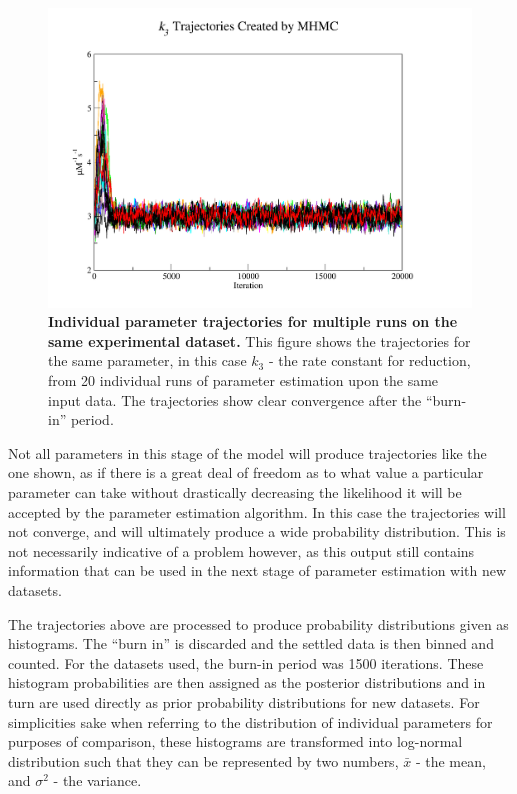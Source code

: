 \begin{figure}[p]
 \centering
 \includegraphics[width=14cm, trim=75px 50px 125px 25px]{./05-oxygenreduction/data/k3s1.pdf}
 \caption[Individual parameter trajectories for multiple runs on the same experimental dataset]{{\bf Individual parameter trajectories for multiple runs on the same experimental dataset.} This figure shows the trajectories for the same parameter, in this case $k_3$ - the rate constant for \cbbthree{} reduction, from 20 individual runs of parameter estimation upon the same input data. The trajectories show clear convergence after the ``burn-in'' period.
 \label{fig:k3s}}
\end{figure}
\afterpage{\clearpage}

Not all parameters in this stage of the model will produce trajectories like the one shown, as if there is a great deal of freedom as to what value a particular parameter can take without drastically decreasing the likelihood it will be accepted by the parameter estimation algorithm. In this case the trajectories will not converge, and will ultimately produce a wide probability distribution. This is not necessarily indicative of a problem however, as this output still contains information that can be used in the next stage of parameter estimation with new datasets.

The trajectories above are processed to produce probability distributions given as histograms. The ``burn in'' is discarded and the settled data is then binned and counted. For the datasets used, the burn-in period was 1500 iterations. These histogram probabilities are then assigned as the posterior distributions and in turn are used directly as prior probability distributions for new datasets. For simplicities sake when referring to the distribution of individual parameters for purposes of comparison, these histograms are transformed into log-normal distribution such that they can be represented by two numbers, $\bar{x}$ - the mean, and $\sigma^2$ - the variance.


